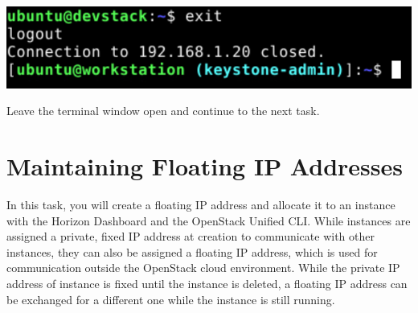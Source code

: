 \documentclass[letterpaper, 12pt]{article}
\begin{document}
\begin{enumerate}
\begin{labstep}
        \begin{center}
            \includegraphics[width=\linewidth]{images/part2/step19.png}
        \end{center}
    \end{labstep}

    \begin{labstep}
        Leave the terminal window open and continue to the next task.
    \end{labstep}

\end{enumerate}

\section{Maintaining Floating IP Addresses}\label{sec:maintaining-floating-ip-addresses}
In this task, you will create a floating IP address and allocate it to an instance with the Horizon Dashboard and the OpenStack Unified CLI.
While instances are assigned a private, fixed IP address at creation to communicate with other instances, they can also be assigned a floating IP address, which is used for communication outside the OpenStack cloud environment.
While the private IP address of instance is fixed until the instance is deleted, a floating IP address can be exchanged for a different one while the instance is still running.
\end{document}
